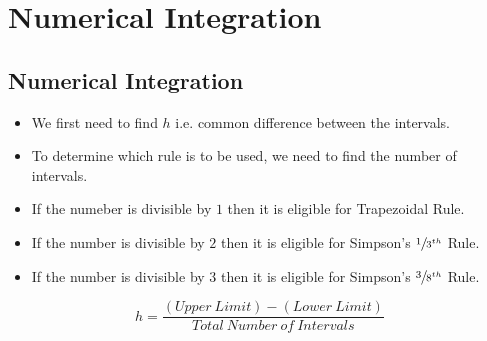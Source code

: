 \newpage

\chapter{Numerical Integration}
\section{Numerical Integration}

\begin{itemize}
    \item We first need to find $h$ i.e. common difference between the intervals.

    \item To determine which rule is to be used, we need to find the number of intervals.

    \item If the numeber is divisible by $1$ then it is eligible for Trapezoidal Rule.

    \item If the number is divisible by $2$ then it is eligible for Simpson's $\sfrac{1}{3^{th}}$ Rule.

    \item If the number is divisible by $3$ then it is eligible for Simpson's $\sfrac{3}{8^{th}}$ Rule.

\end{itemize}

    \[h = \frac{(Upper\ Limit) - (Lower\ Limit)}{Total\ Number\ of\ Intervals}\]





